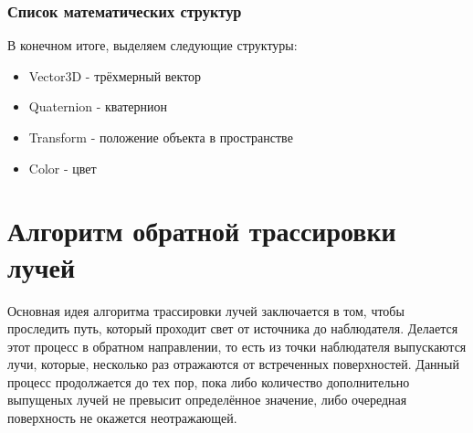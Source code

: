 \documentclass[a4paper, 14pt]{report} %
\begin{document}
	\subsubsection{Список математических структур}
	В конечном итоге, выделяем следующие структуры:
	\begin{itemize}
		\item Vector3D - трёхмерный вектор
		\item Quaternion - кватернион
		\item Transform - положение объекта в пространстве
		\item Color - цвет
	\end{itemize}
	
	\section{Алгоритм обратной трассировки лучей}
	Основная идея алгоритма трассировки лучей заключается в том, чтобы проследить путь, который проходит свет от источника до наблюдателя. Делается этот процесс в обратном направлении, то есть из точки наблюдателя выпускаются лучи, которые, несколько раз отражаются от встреченных поверхностей. Данный процесс продолжается до тех пор, пока либо количество дополнительно выпущеных лучей не превысит определённое значение, либо очередная поверхность не окажется неотражающей.
	
\end{document}
